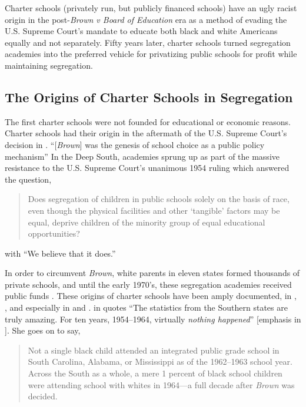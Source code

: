 Charter schools (privately run, but publicly financed schools) have an ugly racist origin in the post-\textit{Brown v Board of Education} era as a method of evading the U.S. Supreme Court's mandate to educate both black and white Americans equally and not separately. Fifty years later, charter schools turned segregation academies into the preferred vehicle for privatizing public schools for profit while maintaining segregation.

\subsection{The Origins of Charter Schools in Segregation}\label{sec:origins}\indent

The first charter schools were not founded for educational or economic reasons. Charter schools had their origin in the aftermath of the U.S. Supreme Court's decision in \textit{}. ``[\textit{Brown}] was the genesis of school choice as a public policy mechanism'' \parencite[8]{Garcia2018} In the Deep South, academies sprung up as part of the massive resistance to the U.S. Supreme Court's unanimous 1954 ruling which answered the question,
\begin{quote}\noindent
Does segregation of children in public schools solely on the basis of race, even though the physical facilities and other `tangible' factors may be equal, deprive children of the minority group of equal educational opportunities? \parencite[9]{Warren1954}
\end{quote}

\noindent{} with ``We believe that it does.'' %

In order to circumvent \textit{Brown}, white parents in eleven states formed thousands of private schools, and until the early 1970's, these segregation academies received public funds \parencite%
  {Rooks2017}. These origins of  charter schools have been amply documented, in \textcite{Frankenberg.etal2010}, \textcite{Frankenberg.etal2011}, and especially in \textcite{Suitts2019} and \textcite{Suitts2020}. \citeauthor{Alexander2011} in  quotes \textcite[52]{Rosenberg1991} ``The statistics from the Southern states are truly amazing. For ten years, 1954–1964, virtually \textit{nothing happened}'' [emphasis in \parencite[223]{Alexander2011}]. She goes on to say, %
\begin{quotation}\noindent
Not a single black child attended an integrated public grade school in South Carolina, Alabama, or Mississippi as of the 1962–1963 school year. Across the South as a whole, a mere 1 percent of black school children were attending school with whites in 1964—a full decade after \textit{Brown} was decided.
\end{quotation}

